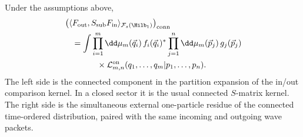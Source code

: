 \begin{theorem}
\label{thm:lsz-wave-packet}
Under the assumptions above,
\begin{equation}
\begin{aligned}
&\left(
\langle F_{\mathrm{out}},S_{\mathrm{sub}} F_{\mathrm{in}}
\rangle_{\mathcal F_s(\Hilb_1)}
\right)_{\mathrm{conn}}
\\
&\quad =
  \int
  \prod_{i=1}^m\dd\mu_m(\vec q_i)\,f_i(\vec q_i)^*
  \prod_{j=1}^n\dd\mu_m(\vec p_j)\,g_j(\vec p_j)
\\
&\qquad\qquad\times
  \mathcal L_{m,n}^{\mathrm{on}}
  (q_1,\ldots,q_m|p_1,\ldots,p_n).
\end{aligned}
\label{eq:lsz-wave-packet-theorem}
\end{equation}
The left side is the connected component in the partition expansion of the
in/out comparison kernel.  In a closed sector it is the usual connected
\(S\)-matrix kernel.  The right side is the simultaneous external one-particle
residue of the connected time-ordered distribution, paired with the same
incoming and outgoing wave packets.
\end{theorem}

